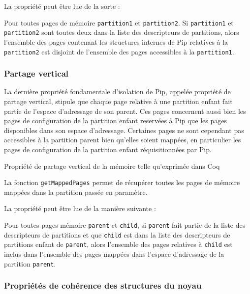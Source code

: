 			La propriété peut être lue de la sorte :
			\begin{theorem}
				Pour toutes pages de mémoire \texttt{partition1} et \texttt{partition2}. Si \texttt{partition1} et \texttt{partition2} sont toutes deux dans la liste des descripteurs de partitions, alors l'ensemble des pages contenant les structures internes de Pip relatives à la \texttt{partition2} est disjoint de l'ensemble des pages accessibles à la \texttt{partition1}.
			\end{theorem}

			\subsubsection{Partage vertical}

			La dernière propriété fondamentale d'isolation de Pip, appelée propriété de partage vertical, stipule que chaque page relative à une partition enfant fait partie de l'espace d'adressage de son parent. Ces pages concernent aussi bien les pages de configuration de la partition enfant reservées à Pip que les pages disponibles dans son espace d'adressage. Certaines pages ne sont cependant pas accessibles à la partition parent bien qu'elles soient mappées, en particulier les pages de configuration de la partition enfant réquisitionnées par Pip.

			\begin{listing}[!ht]
				\caption{Propriété de partage vertical de la mémoire telle qu'exprimée dans Coq}
				\label{code:vertical_sharing}
			\end{listing}

			La fonction \texttt{getMappedPages} permet de récupérer toutes les pages de mémoire mappées dans la partition passée en paramètre.

			La propriété peut être lue de la manière suivante :

			\begin{theorem}
				Pour toutes pages mémoire \texttt{parent} et \texttt{child}, si \texttt{parent} fait partie de la liste des descripteurs de partitions et que \texttt{child} est dans la liste des descripteurs de partitions enfant de \texttt{parent}, alors l'ensemble des pages relatives à \texttt{child} est inclus dans l'ensemble des pages mappées dans l'espace d'adressage de la partition \texttt{parent}.
			\end{theorem}

			\subsubsection{Propriétés de cohérence des structures du noyau}

